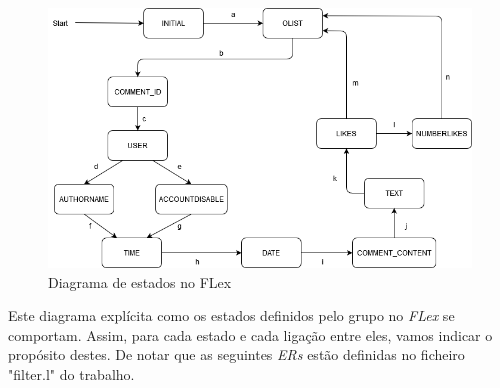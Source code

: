 \documentclass[a4paper,12pt]{report}
\begin{document}
\begin{figure}[h]
        \centering
        \includegraphics[scale=0.65]{images/StateDiagramPL.png}
        \caption{Diagrama de estados no FLex}
        \label{img:StateDiagramPL}
    \end{figure}


\par Este diagrama explícita como os estados definidos pelo grupo no \textit{FLex} se comportam. Assim, para cada estado e cada ligação entre eles, vamos indicar o propósito destes. De notar que as seguintes \textit{ERs} estão definidas no ficheiro "filter.l" do trabalho.  

\vspace{6cm}
\end{document}
